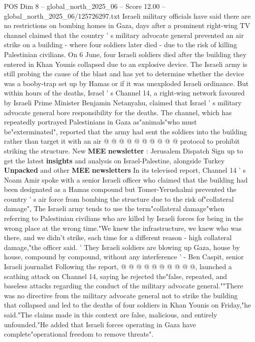 \begin{textsample}{POS Dim 8 – global\_north\_2025\_06 – Score 12.00 – global\_north\_2025\_06/125726297.txt}  \label{ex:f8_pos_049}
Israeli military officials have said there are no restrictions on bombing homes in Gaza, days after a prominent right-wing TV channel claimed that the country ' s military advocate general prevented an air strike on a building - where four soldiers later died - due to the risk of killing Palestinian civilians.
On 6 June, four Israeli soldiers died after the building they entered in Khan Younis collapsed due to an explosive device.
The Israeli army is still probing the cause of the blast and has yet to determine whether the device was a booby-trap set up by Hamas or if it was unexploded Israeli ordinance.
But within hours of the deaths, Israel ' s Channel 14, a right-wing network favoured by Israeli Prime Minister Benjamin Netanyahu, claimed that Israel ' s military advocate general bore responsibility for the deaths.
The channel, which has repeatedly portrayed Palestinians in Gaza as"animals"who must be"exterminated", reported that the army had sent the soldiers into the building rather than target it with an air @ @ @ @ @ @ @ @ @ @ protocol to prohibit striking the structure.
New \textbf{MEE} \textbf{newsletter} : Jerusalem Dispatch Sign up to get the latest \textbf{insights} and analysis on Israel-Palestine, alongside Turkey \textbf{Unpacked} and other \textbf{MEE} \textbf{newsletters} In its televised report, Channel 14 ' s Noam Amir spoke with a senior Israeli officer who claimed that the building had been designated as a Hamas compound but Tomer-Yerushalmi prevented the country ' s air force from bombing the structure due to the risk of"collateral damage", The Israeli army tends to use the term"collateral damage"when referring to Palestinian civilians who are killed by Israeli forces for being in the wrong place at the wrong time."We knew the infrastructure, we knew who was there, and we didn't strike, each time for a different reason - high collateral damage,"the officer said. ' They Israeli soldiers are blowing up Gaza, house by house, compound by compound, without any interference ' - Ben Caspit, senior Israeli journalist Following the report, @ @ @ @ @ @ @ @ @ @, launched a scathing attack on Channel 14, saying he rejected the"false, repeated, and baseless attacks regarding the conduct of the military advocate general.""There was no directive from the military advocate general not to strike the building that collapsed and led to the deaths of four soldiers in Khan Younis on Friday,"he said."The claims made in this context are false, malicious, and entirely unfounded."He added that Israeli forces operating in Gaza have complete"operational freedom to remove threats".

\end{textsample}
